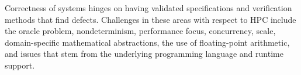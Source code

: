 \begin{WrapText}
\footnotesize
Correctness of systems hinges
on having validated specifications
and
verification methods that find 
defects.
Challenges in these areas with
respect to
HPC include
the oracle problem, nondeterminism,
performance focus, concurrency,
scale, domain-specific mathematical
abstractions, the use of
floating-point arithmetic, 
and issues that stem from the
underlying programming language
and runtime support.
\end{WrapText}